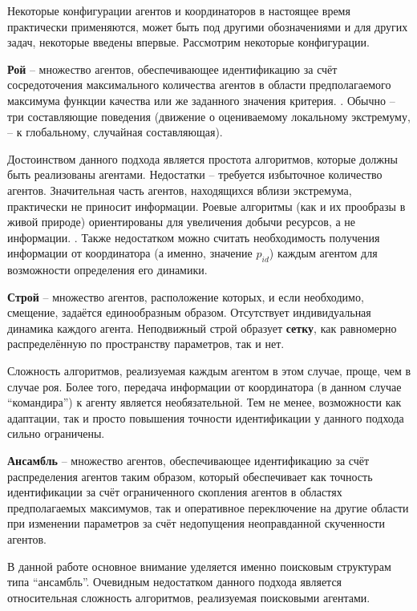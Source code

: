 Некоторые конфигурации агентов и координаторов
в настоящее время практически применяются,
может быть под другими обозначениями и для других задач,
некоторые введены впервые.
Рассмотрим некоторые конфигурации.


\textbf{ Рой } -- множество агентов, обеспечивающее идентификацию за счёт
сосредоточения максимального количества агентов
в области предполагаемого максимума функции качества или же
заданного значения критерия. .
Обычно -- три составляющие поведения
(движение о оцениваемому локальному экстремуму, -- к глобальному, случайная составляющая).



Достоинством данного подхода является простота алгоритмов,
которые должны быть реализованы агентами.
Недостатки -- требуется избыточное количество агентов.
Значительная часть агентов, находящихся вблизи экстремума,
практически не приносит информации. Роевые
алгоритмы (как и их прообразы в живой природе) ориентированы
для увеличения добычи ресурсов, а не информации. .
Также недостатком можно считать необходимость
получения информации от координатора (а именно, значение $p_{id}$)
каждым агентом для возможности определения его динамики.

\textbf{ Строй } -- множество агентов, расположение которых,
и если необходимо, смещение, задаётся
единообразным образом.
Отсутствует индивидуальная динамика каждого агента.
Неподвижный строй образует \textbf{сетку},
как равномерно распределённую по пространству параметров,
так и нет.

Сложность алгоритмов, реализуемая каждым агентом в этом случае,
проще, чем в случае роя. Более того, передача информации от
координатора (в данном случае ``командира'') к агенту
является необязательной.
Тем не менее, возможности как адаптации,
так и просто повышения точности идентификации
у данного подхода сильно ограничены.

\textbf{ Ансамбль } -- множество агентов, обеспечивающее идентификацию за счёт
распределения агентов таким образом, который обеспечивает как
точность идентификации за счёт ограниченного скопления агентов
в областях предполагаемых максимумов, так и оперативное переключение
на другие области при изменении параметров за счёт недопущения
неоправданной скученности агентов.

В данной работе основное внимание уделяется именно
поисковым структурам типа ``ансамбль''.
Очевидным недостатком данного подхода является
относительная сложность алгоритмов, реализуемая поисковыми агентами.


